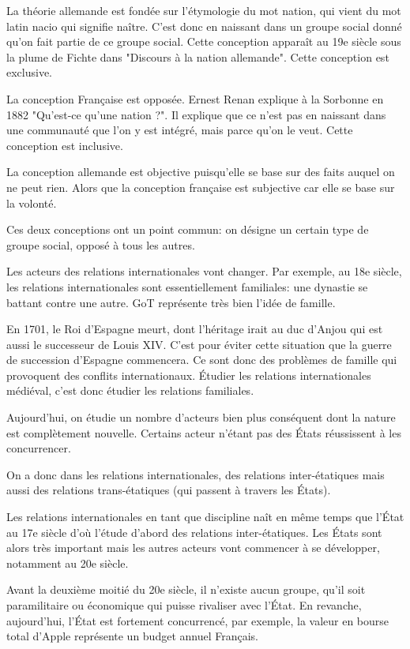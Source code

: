 ﻿\documentclass[12pt, a4paper, openany]{book}
\begin{document}
La théorie allemande est fondée sur l'étymologie du mot nation, qui vient du mot latin nacio qui signifie naître. C'est donc en naissant dans un groupe social donné qu'on fait partie de ce groupe social. Cette conception apparaît au 19e siècle sous la plume de Fichte dans "Discours à la nation allemande". Cette conception est exclusive.

La conception Française est opposée. Ernest Renan explique à la Sorbonne en 1882 "Qu'est-ce qu'une nation ?". Il explique que ce n'est pas en naissant dans une communauté que l'on y est intégré, mais parce qu'on le veut. Cette conception est inclusive.

La conception allemande est objective puisqu'elle se base sur des faits auquel on ne peut rien. Alors que la conception française est subjective car elle se base sur la volonté.

Ces deux conceptions ont un point commun: on désigne un certain type de groupe social, opposé à tous les autres.


Les acteurs des relations internationales vont changer. Par exemple, au 18e siècle, les relations internationales sont essentiellement familiales: une dynastie se battant contre une autre. GoT représente très bien l'idée de famille.

En 1701, le Roi d'Espagne meurt, dont l'héritage irait au duc d'Anjou qui est aussi le successeur de Louis XIV. C'est pour éviter cette situation que la guerre de succession d'Espagne commencera. Ce sont donc des problèmes de famille qui provoquent des conflits internationaux. Étudier les relations internationales médiéval, c'est donc étudier les relations familiales.

Aujourd'hui, on étudie un nombre d'acteurs bien plus conséquent dont la nature est complètement nouvelle. Certains acteur n'étant pas des États réussissent à les concurrencer.

On a donc dans les relations internationales, des relations inter-étatiques mais aussi des relations trans-étatiques (qui passent à travers les États).

Les relations internationales en tant que discipline naît en même temps que l'État au 17e siècle d'où l'étude d'abord des relations inter-étatiques. Les États sont alors très important mais les autres acteurs vont commencer à se développer, notamment au 20e siècle.

Avant la deuxième moitié du 20e siècle, il n'existe aucun groupe, qu'il soit paramilitaire ou économique qui puisse rivaliser avec l'État. En revanche, aujourd'hui, l'État est fortement concurrencé, par exemple, la valeur en bourse total d'Apple représente un budget annuel Français.
\end{document}
